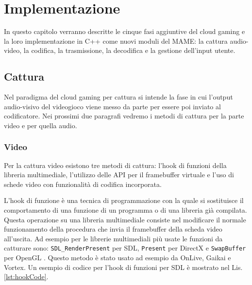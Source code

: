 %
%
\chapter{Implementazione}
In questo capitolo verranno descritte le cinque fasi aggiuntive del cloud gaming e la loro implementazione in C++ come nuovi moduli del MAME: la cattura audio-video, la codifica, la trasmissione, la decodifica e la gestione dell'input utente.




\section{Cattura}
Nel paradigma del cloud gaming per cattura si intende la fase in cui l'output audio-visivo del videogioco viene messo da parte per essere poi inviato al codificatore. Nei prossimi due paragrafi vedremo i metodi di cattura per la parte video e per quella audio.


\subsection{Video} \label{chap:CatturaVideo}
Per la cattura video esistono tre metodi di cattura: l'hook di funzioni della libreria multimediale, l'utilizzo delle API per il framebuffer virtuale e l'uso di schede video con funzionalità di codifica incorporata.

L'hook di funzione è una tecnica di programmazione con la quale si sostituisce il comportamento di una funzione di un programma o di una libreria già compilata. Questa operazione su una libreria multimediale consiste nel modificare il normale funzionamento della procedura che invia il framebuffer della scheda video all'uscita. Ad esempio per le librerie multimediali più usate le funzioni da catturare sono: \verb|SDL_RenderPresent| per SDL, \verb|Present| per DirectX e \verb|SwapBuffer| per OpenGL \parencite{GamingAnywhere}. Questo metodo è stato usato ad esempio da OnLive, Gaikai e Vortex. Un esempio di codice per l'hook di funzioni per SDL è mostrato nel Lis. \ref{lst:hookCode}.

